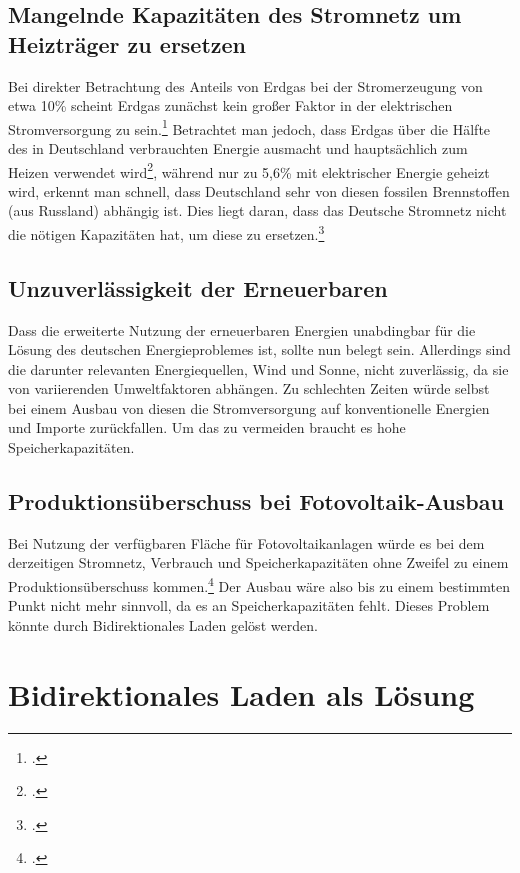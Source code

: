 \documentclass[12pt, ngerman]{article}
\begin{document}
\subsection{Mangelnde Kapazitäten des Stromnetz um Heizträger zu ersetzen}
Bei direkter Betrachtung des Anteils von Erdgas bei der Stromerzeugung von etwa 10\% scheint Erdgas zunächst
kein großer Faktor in der elektrischen Stromversorgung zu sein.\footcite{SMARDHoherEEAnteil,EnergieWofuerErdgas}
Betrachtet man jedoch, dass Erdgas über die Hälfte des in Deutschland verbrauchten
Energie ausmacht und hauptsächlich zum Heizen verwendet wird\footcite{Anwendungsbereiche,EnergieWofuerErdgas},
während nur zu 5,6\% mit elektrischer Energie geheizt wird, erkennt man schnell, dass Deutschland sehr von diesen
fossilen Brennstoffen (aus Russland) abhängig ist.
Dies liegt daran, dass das Deutsche Stromnetz nicht die nötigen Kapazitäten hat, um diese zu
ersetzen.\footcite{EnergieWofuerErdgas}



\subsection{Unzuverlässigkeit der Erneuerbaren}
Dass die erweiterte Nutzung der erneuerbaren Energien unabdingbar für die Lösung des deutschen Energieproblemes
ist, sollte nun belegt sein. Allerdings sind die darunter relevanten Energiequellen, Wind und Sonne, nicht
zuverlässig, da sie von variierenden Umweltfaktoren abhängen. Zu schlechten Zeiten würde selbst bei einem Ausbau
von diesen die Stromversorgung auf konventionelle Energien und Importe zurückfallen. Um das zu vermeiden braucht
es hohe Speicherkapazitäten.

\subsection{Produktionsüberschuss bei Fotovoltaik-Ausbau}
Bei Nutzung der verfügbaren Fläche für Fotovoltaikanlagen würde es bei dem derzeitigen Stromnetz, Verbrauch und
Speicherkapazitäten ohne Zweifel zu einem Produktionsüberschuss kommen.\footcite{wirthAktuelleFaktenZur}
Der Ausbau wäre also bis zu einem bestimmten Punkt nicht mehr sinnvoll, da es an Speicherkapazitäten fehlt.
Dieses Problem könnte durch Bidirektionales Laden gelöst werden.


\section{Bidirektionales Laden als Lösung}
\end{document}
